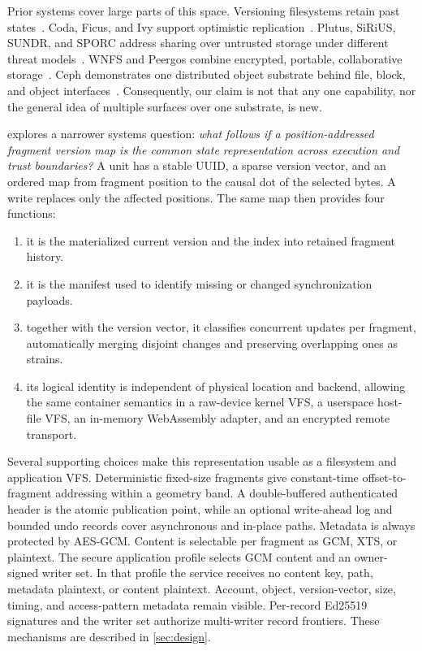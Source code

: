 Prior systems cover large parts of this space.  Versioning filesystems retain
past states~\citep{Santry1999Elephant,Soules2003CVFS,Peterson2005Ext3cow}.  Coda,
Ficus, and Ivy support optimistic replication~\citep{Kistler1992Coda,
Reiher1994Ficus,Muthitacharoen2002Ivy}.  Plutus, SiRiUS, SUNDR, and SPORC address
sharing over untrusted storage under different threat
models~\citep{Kallahalla2003Plutus,Goh2003SiRiUS,Li2004SUNDR,Feldman2010SPORC}.
WNFS and Peergos combine encrypted, portable, collaborative
storage~\citep{WNFSspec,Peergos}.  Ceph demonstrates one distributed object
substrate behind file, block, and object interfaces~\citep{Weil2006Ceph}.
Consequently, our claim is not that any one capability, nor the general idea of
multiple surfaces over one substrate, is new.

\sfs{} explores a narrower systems question: \emph{what follows if a
position-addressed fragment version map is the common state representation
across execution and trust boundaries?}  A unit has a stable UUID, a sparse
version vector, and an ordered map from fragment position to the causal dot of
the selected bytes.  A write replaces only the affected positions.  The same
map then provides four functions:

\begin{enumerate}[leftmargin=1.6em,itemsep=2pt]
  \item it is the materialized current version and the index into retained
    fragment history.
  \item it is the manifest used to identify missing or changed synchronization
    payloads.
  \item together with the version vector, it classifies concurrent updates per
    fragment, automatically merging disjoint changes and preserving overlapping
    ones as strains.
  \item its logical identity is independent of physical location and backend,
    allowing the same container semantics in a raw-device kernel VFS, a
    userspace host-file VFS, an in-memory WebAssembly adapter, and an encrypted
    remote transport.
\end{enumerate}

Several supporting choices make this representation usable as a filesystem and
application VFS.  Deterministic fixed-size fragments give constant-time
offset-to-fragment addressing within a geometry band.  A double-buffered
authenticated header is the atomic publication point, while an optional
write-ahead log and bounded undo records cover asynchronous and in-place paths.
Metadata is always protected by AES-GCM.  Content is selectable per fragment as
GCM, XTS, or plaintext.  The secure application profile selects GCM content and
an owner-signed writer set.  In that profile the service receives no content
key, path, metadata plaintext, or content plaintext.  Account, object,
version-vector, size, timing, and access-pattern metadata remain visible.
Per-record Ed25519 signatures and the writer set authorize multi-writer record
frontiers.  These mechanisms are described in \cref{sec:design}.


